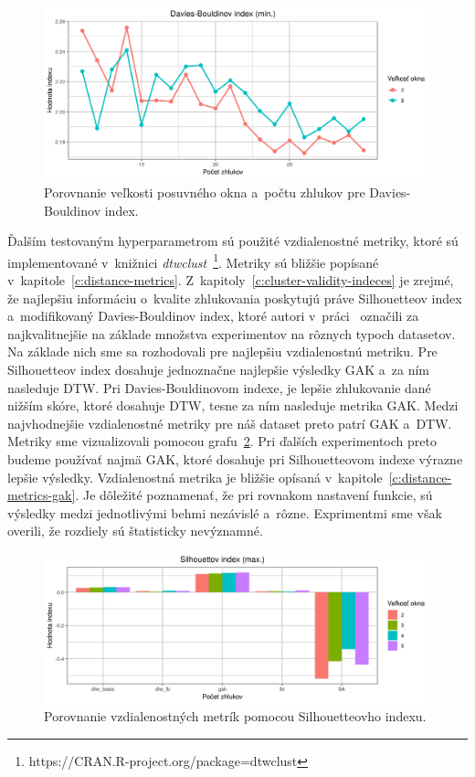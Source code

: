 \documentclass[a4paper,twoside,slovak,12pt,appendix]{article}
\begin{document}
\begin{figure}[htbp]
  \centering
  \includegraphics[width=\textwidth]{cvi/dtw_basic_workdays_dense/201904291110-DB-dtw_basic_workdays_dense.png}
  \caption{Porovnanie veľkosti posuvného okna a~počtu zhlukov pre Davies-Bouldinov index.}
	\label{fig:cvi-dense-db}
\end{figure}

\noindent
Ďalším testovaným hyperparametrom sú použité vzdialenostné metriky, ktoré sú
implementované v~knižnici
\textit{dtwclust}~\footnote{https://CRAN.R-project.org/package=dtwclust}.
Metriky sú bližšie popísané v~kapitole~\ref{c:distance-metrics}.
Z~kapitoly~\ref{c:cluster-validity-indeces} je zrejmé, že najlepšiu informáciu
o~kvalite zhlukovania poskytujú práve Silhouetteov index
a~modifikovaný Davies-Bouldinov index, ktoré autori v~práci~\cite{Arbelaitz2013}
označili za najkvalitnejšie na základe množstva experimentov na rôznych typoch
datasetov. Na základe nich sme sa rozhodovali pre najlepšiu vzdialenostnú
metriku. Pre Silhouetteov index dosahuje jednoznačne najlepšie výsledky GAK a~za
ním nasleduje DTW. Pri Davies-Bouldinovom indexe, je lepšie zhlukovanie dané
nižším skóre, ktoré dosahuje DTW, tesne za ním nasleduje metrika GAK. Medzi
najvhodnejšie vzdialenostné metriky pre náš dataset preto patrí GAK a~DTW.
Metriky sme vizualizovali pomocou grafu~\ref{fig:cvi-metric-sil}. Pri ďalších
experimentoch preto budeme používať najmä GAK, ktoré dosahuje pri Silhouetteovom
indexe výrazne lepšie výsledky. Vzdialenostná metrika je bližšie opísaná
v~kapitole~\ref{c:distance-metrics-gak}. Je dôležité poznamenať, že pri rovnakom
nastavení funkcie, sú výsledky medzi jednotlivými behmi nezávislé a~rôzne.
Exprimentmi sme však overili, že rozdiely sú štatisticky nevýznamné.

\begin{figure}[H]
  \centering
  \includegraphics[width=\textwidth]{cvi/metric_comparison/201904291105-Sil-metric_comparison.png}
  \caption{Porovnanie vzdialenostných metrík pomocou Silhouetteovho indexu.}
	\label{fig:cvi-metric-sil}
\end{figure}
\end{document}
